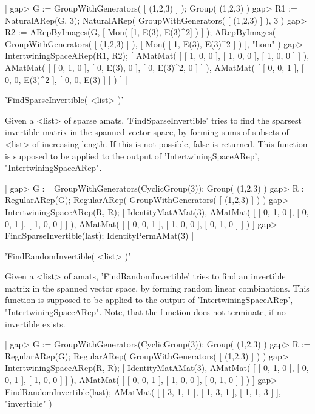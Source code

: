 |    gap> G := GroupWithGenerators( [ (1,2,3) ] );
    Group( (1,2,3) )
    gap> R1 := NaturalARep(G, 3);
    NaturalARep( GroupWithGenerators( [ (1,2,3) ] ), 3 )
    gap> R2 := ARepByImages(G, [ Mon( [1, E(3), E(3)^2] ) ] );
    ARepByImages(
      GroupWithGenerators( [ (1,2,3) ] ),
      [ Mon( [ 1, E(3), E(3)^2 ] )
      ],
      "hom"
    )
    gap> IntertwiningSpaceARep(R1, R2);
    [ AMatMat( [ [ 1, 0, 0 ], [ 1, 0, 0 ], [ 1, 0, 0 ] ] ), 
      AMatMat( [ [ 0, 1, 0 ], [ 0, E(3), 0 ], [ 0, E(3)^2, 0 ] ] ), 
      AMatMat( [ [ 0, 0, 1 ], [ 0, 0, E(3)^2 ], [ 0, 0, E(3) ] ] ) ] |


'FindSparseInvertible( <list> )'

Given a <list> of sparse amats, 'FindSparseInvertible' tries to find
the sparsest invertible matrix in the spanned vector space, by forming
sums of subsets of <list> of increasing length. If this is not
possible, false is returned. This function is supposed to be applied
to the output of 'IntertwiningSpaceARep', "IntertwiningSpaceARep".

|    gap> G := GroupWithGenerators(CyclicGroup(3));
    Group( (1,2,3) )
    gap> R := RegularARep(G);
    RegularARep( GroupWithGenerators( [ (1,2,3) ] ) )
    gap> IntertwiningSpaceARep(R, R);
    [ IdentityMatAMat(3), AMatMat(
          [ [ 0, 1, 0 ], [ 0, 0, 1 ], [ 1, 0, 0 ] ]
        ), AMatMat(
          [ [ 0, 0, 1 ], [ 1, 0, 0 ], [ 0, 1, 0 ] ]
        ) ]
    gap> FindSparseInvertible(last);
    IdentityPermAMat(3) |


'FindRandomInvertible( <list> )'

Given a <list> of amats, 'FindRandomInvertible' tries to find
an invertible matrix in the spanned vector space, by forming
random linear combinations. This function is supposed to be applied
to the output of 'IntertwiningSpaceARep', "IntertwiningSpaceARep".
Note, that the function does not terminate, if no invertible exists.

|    gap> G := GroupWithGenerators(CyclicGroup(3));
    Group( (1,2,3) )
    gap> R := RegularARep(G);
    RegularARep( GroupWithGenerators( [ (1,2,3) ] ) )
    gap> IntertwiningSpaceARep(R, R);
    [ IdentityMatAMat(3), AMatMat(
          [ [ 0, 1, 0 ], [ 0, 0, 1 ], [ 1, 0, 0 ] ]
        ), AMatMat(
          [ [ 0, 0, 1 ], [ 1, 0, 0 ], [ 0, 1, 0 ] ]
        ) ]
    gap> FindRandomInvertible(last);
    AMatMat(
      [ [ 3, 1, 1 ], [ 1, 3, 1 ], [ 1, 1, 3 ] ],
      "invertible"
    ) |

